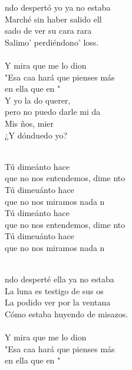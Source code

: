 \begin{cancion}%
	ndo despertó yo ya no estaba\\
	Marché sin haber salido ell\\
	sado de ver su cara rara\\
	Salimo' perdiéndono' loss.\\
\jump\\
	Y mira que me lo dion\\
	"Esa caa hará que pienses más \\
	en ella que en "\\
	Y yo la do querer, \\
	pero no puedo darle mi da\\
	Mis ños, mier\\
	¿Y dónduedo yo?\\\jump\\
	\begin{chorus}%
	Tú dimeánto hace \\
	que no nos entendemos, dime nto \\
	Tú dimeuánto hace  \\
	que no nos miramos nada n\\
	Tú dimeánto hace  \\
	que no nos entendemos, dime nto \\
	Tú dimeuánto hace  \\
	que no nos miramos nada n\\
	\end{chorus}%
	\jump\\
	ndo desperté ella ya no estaba\\
	La luna es testigo de sus os\\
	La podido ver por la ventana\\
	Cómo estaba huyendo de misazos.\\
\jump\\
	Y mira que me lo dion\\
	"Esa caa hará que pienses más \\
	en ella que en "\\

\end{cancion}

